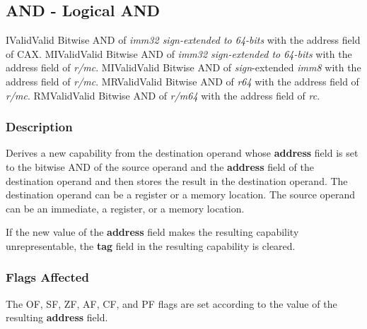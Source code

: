 \clearpage
{}
{}
\subsection*{AND - Logical AND}

\begin{x86opcodetable}
  {I}{Valid}{Valid}
  {Bitwise AND of \emph{imm32 sign-extended to 64-bits} with the
    address field of CAX.}
  {MI}{Valid}{Valid}
  {Bitwise AND of \emph{imm32 sign-extended to 64-bits} with the
    address field of \emph{r/mc}.}
  {MI}{Valid}{Valid}
  {Bitwise AND of \emph{sign}-extended \emph{imm8} with the address
    field of \emph{r/mc}.}
  {MR}{Valid}{Valid}
  {Bitwise AND of \emph{r64} with the address field of \emph{r/mc}.}
  {RM}{Valid}{Valid}
  {Bitwise AND of \emph{r/m64} with the address field of \emph{rc}.}
\end{x86opcodetable}

\begin{x86opentable}
\end{x86opentable}

\subsubsection*{Description}

Derives a new capability from the destination operand whose
\textbf{address} field is set to the bitwise AND of the source operand
and the \textbf{address} field of the destination operand and then
stores the result in the destination operand. The destination operand
can be a register or a memory location. The source operand can be an
immediate, a register, or a memory location.

If the new value of the \textbf{address} field makes the resulting
capability unrepresentable, the \textbf{tag} field in the resulting
capability is cleared.

\subsubsection*{Flags Affected}

The OF, SF, ZF, AF, CF, and PF flags are set according to the value of
the resulting \textbf{address} field.
